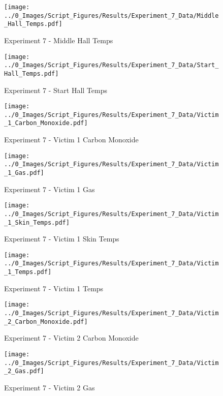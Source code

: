 	\clearpage

	\begin{figure}[H]
		\centering
		\texttt{[image: ../0\_Images/Script\_Figures/Results/Experiment\_7\_Data/Middle\_Hall\_Temps.pdf]}
		\caption[]{Experiment 7 - Middle Hall Temps}
	\end{figure}
 

	\begin{figure}[H]
		\centering
		\texttt{[image: ../0\_Images/Script\_Figures/Results/Experiment\_7\_Data/Start\_Hall\_Temps.pdf]}
		\caption[]{Experiment 7 - Start Hall Temps}
	\end{figure}
 
	\clearpage

	\begin{figure}[H]
		\centering
		\texttt{[image: ../0\_Images/Script\_Figures/Results/Experiment\_7\_Data/Victim\_1\_Carbon\_Monoxide.pdf]}
		\caption[]{Experiment 7 - Victim 1 Carbon Monoxide}
	\end{figure}
 

	\begin{figure}[H]
		\centering
		\texttt{[image: ../0\_Images/Script\_Figures/Results/Experiment\_7\_Data/Victim\_1\_Gas.pdf]}
		\caption[]{Experiment 7 - Victim 1 Gas}
	\end{figure}
 
	\clearpage

	\begin{figure}[H]
		\centering
		\texttt{[image: ../0\_Images/Script\_Figures/Results/Experiment\_7\_Data/Victim\_1\_Skin\_Temps.pdf]}
		\caption[]{Experiment 7 - Victim 1 Skin Temps}
	\end{figure}
 

	\begin{figure}[H]
		\centering
		\texttt{[image: ../0\_Images/Script\_Figures/Results/Experiment\_7\_Data/Victim\_1\_Temps.pdf]}
		\caption[]{Experiment 7 - Victim 1 Temps}
	\end{figure}
 
	\clearpage

	\begin{figure}[H]
		\centering
		\texttt{[image: ../0\_Images/Script\_Figures/Results/Experiment\_7\_Data/Victim\_2\_Carbon\_Monoxide.pdf]}
		\caption[]{Experiment 7 - Victim 2 Carbon Monoxide}
	\end{figure}
 

	\begin{figure}[H]
		\centering
		\texttt{[image: ../0\_Images/Script\_Figures/Results/Experiment\_7\_Data/Victim\_2\_Gas.pdf]}
		\caption[]{Experiment 7 - Victim 2 Gas}
	\end{figure}
 
